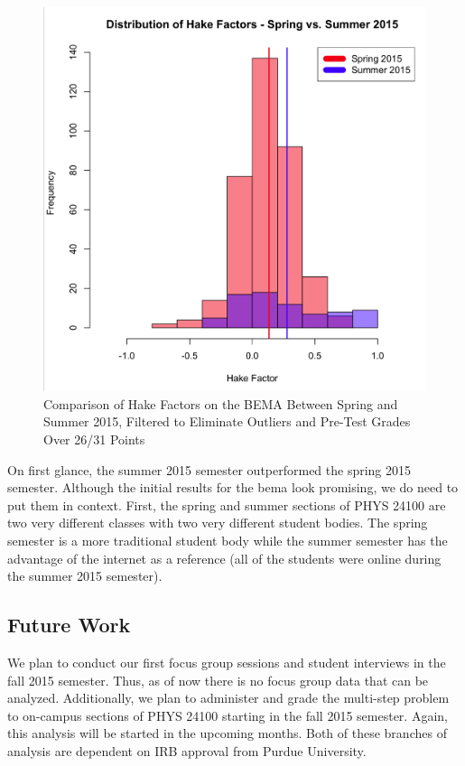 \begin{figure}[!htb]
	\centering
	\includegraphics[width=6in]{img/chapter4/hake_spring_vs_summer_filtered}
	\caption[Comparison of Hake Factors on the BEMA Between Spring and Summer 2015, Filtered to Eliminate Outliers and Pre-Test Grades Over 26/31 Points ]{Comparison of Hake Factors on the BEMA Between Spring and Summer 2015, Filtered to Eliminate Outliers and Pre-Test Grades Over 26/31 Points}
  \label{fig:hakeFiltered}
\end{figure}

On first glance, the summer 2015 semester outperformed the spring 2015 semester. Although the initial results for the \gls{bema} look promising, we do need to put them in context. First, the spring and summer sections of PHYS 24100 are two very different classes with two very different student bodies. The spring semester is a more traditional student body while the summer semester has the advantage of the internet as a reference (all of the students were online during the summer 2015 semester).

\subsection{Future Work}

We plan to conduct our first focus group sessions and student interviews in the fall 2015 semester. Thus, as of now there is no focus group data that can be analyzed. Additionally, we plan to administer and grade the multi-step problem to on-campus sections of PHYS 24100 starting in the fall 2015 semester. Again, this analysis will be started in the upcoming months. Both of these branches of analysis are dependent on IRB approval from Purdue University.

